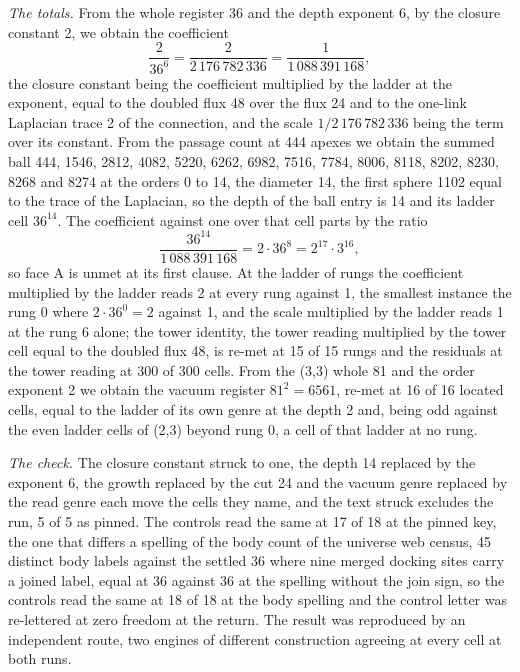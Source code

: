 \begin{chproof}
\textit{The totals.} From the whole register 36 and the depth exponent 6, by the closure constant 2, we obtain the coefficient
\begin{equation}
\frac{2}{36^{6}} = \frac{2}{2\,176\,782\,336} = \frac{1}{1\,088\,391\,168},
\end{equation}
the closure constant being the coefficient multiplied by the ladder at the exponent, equal to the doubled flux 48 over the flux 24 and to the one-link Laplacian trace 2 of the connection, and the scale $1/2\,176\,782\,336$ being the term over its constant. From the passage count at 444 apexes we obtain the summed ball 444, 1546, 2812, 4082, 5220, 6262, 6982, 7516, 7784, 8006, 8118, 8202, 8230, 8268 and 8274 at the orders 0 to 14, the diameter 14, the first sphere 1102 equal to the trace of the Laplacian, so the depth of the ball entry is 14 and its ladder cell $36^{14}$. The coefficient against one over that cell parts by the ratio
\begin{equation}
\frac{36^{14}}{1\,088\,391\,168} = 2\cdot 36^{8} = 2^{17}\cdot 3^{16},
\end{equation}
so face A is unmet at its first clause. At the ladder of rungs the coefficient multiplied by the ladder reads 2 at every rung against 1, the smallest instance the rung 0 where $2\cdot 36^{0} = 2$ against 1, and the scale multiplied by the ladder reads 1 at the rung 6 alone; the tower identity, the tower reading multiplied by the tower cell equal to the doubled flux 48, is re-met at 15 of 15 rungs and the residuals at the tower reading at 300 of 300 cells. From the (3,3) whole 81 and the order exponent 2 we obtain the vacuum register $81^{2} = 6561$, re-met at 16 of 16 located cells, equal to the ladder of its own genre at the depth 2 and, being odd against the even ladder cells of (2,3) beyond rung 0, a cell of that ladder at no rung.

\textit{The check.} The closure constant struck to one, the depth 14 replaced by the exponent 6, the growth replaced by the cut 24 and the vacuum genre replaced by the read genre each move the cells they name, and the text struck excludes the run, 5 of 5 as pinned. The controls read the same at 17 of 18 at the pinned key, the one that differs a spelling of the body count of the universe web census, 45 distinct body labels against the settled 36 where nine merged docking sites carry a joined label, equal at 36 against 36 at the spelling without the join sign, so the controls read the same at 18 of 18 at the body spelling and the control letter was re-lettered at zero freedom at the return. The result was reproduced by an independent route, two engines of different construction agreeing at every cell at both runs.
\end{chproof}
